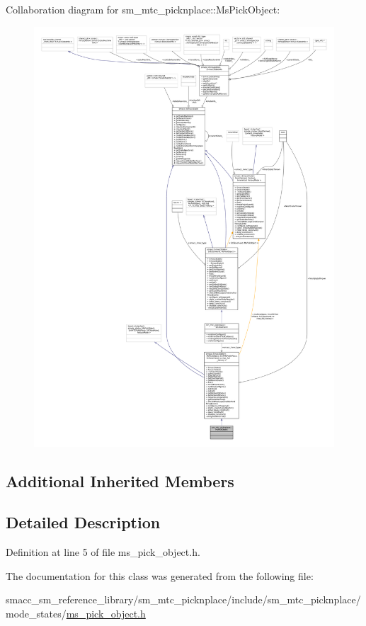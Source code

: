 Collaboration diagram for sm\+\_\+mtc\+\_\+picknplace\+:\+:Ms\+Pick\+Object\+:
\nopagebreak
\begin{figure}[H]
\begin{center}
\leavevmode
\includegraphics[width=350pt]{classsm__mtc__picknplace_1_1MsPickObject__coll__graph}
\end{center}
\end{figure}
\subsection*{Additional Inherited Members}


\subsection{Detailed Description}


Definition at line 5 of file ms\+\_\+pick\+\_\+object.\+h.



The documentation for this class was generated from the following file\+:\begin{DoxyCompactItemize}
\item 
smacc\+\_\+sm\+\_\+reference\+\_\+library/sm\+\_\+mtc\+\_\+picknplace/include/sm\+\_\+mtc\+\_\+picknplace/mode\+\_\+states/\hyperlink{ms__pick__object_8h}{ms\+\_\+pick\+\_\+object.\+h}\end{DoxyCompactItemize}
